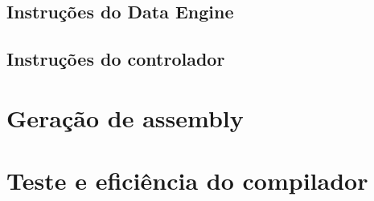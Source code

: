 \subsection{Instruções do Data Engine}
\label{section:Instrucoes do Data Engine}

\subsection{Instruções do controlador}
\label{section:Instrucoes do controlador}


\section{Geração de assembly}
\label{section:Geracao de assembly}

\section{Teste e eficiência do compilador}
\label{section:Teste e eficiencia do compilador}




\cleardoublepage
